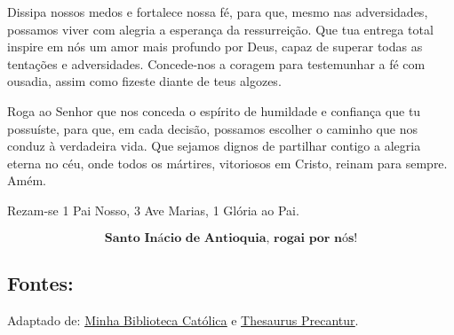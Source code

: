 \documentclass[a4paper,14pt]{extarticle} \usepackage[utf8]{inputenc}
\begin{document}
Dissipa nossos medos e fortalece nossa fé, para que, mesmo nas adversidades, possamos viver com alegria a esperança da ressurreição. Que tua entrega total inspire em nós um amor mais profundo por Deus, capaz de superar todas as tentações e adversidades. Concede-nos a coragem para testemunhar a fé com ousadia, assim como fizeste diante de teus algozes.

Roga ao Senhor que nos conceda o espírito de humildade e confiança que tu possuíste, para que, em cada decisão, possamos escolher o caminho que nos conduz à verdadeira vida. Que sejamos dignos de partilhar contigo a alegria eterna no céu, onde todos os mártires, vitoriosos em Cristo, reinam para sempre. Amém.

\begin{center}
  Rezam-se 1 Pai Nosso, 3 Ave Marias, 1 Glória ao Pai.
\end{center}

\[
\textbf{Santo Inácio de Antioquia, rogai por nós!}
\]

\vfill

\begin{center}
\subsection*{Fontes:}
Adaptado de: \underline{\href{https://bibliotecacatolica.com.br/blog/devocao/santo-inacio-de-antioquia/}{Minha Biblioteca Católica}} e \underline{\href{https://precantur.blogspot.com/2019/01/novena-ou-triduo-santo-inacio-de-antioquia.html}{Thesaurus Precantur}}.
\end{center}
\end{document}
